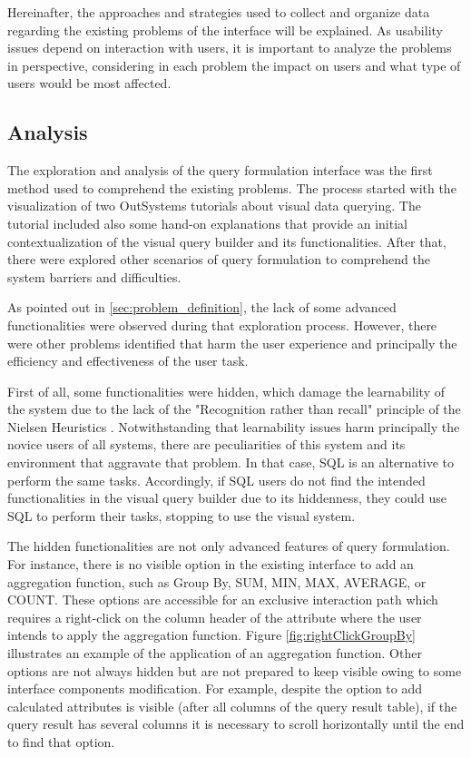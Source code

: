 Hereinafter, the approaches and strategies used to collect and organize data regarding the existing problems of the interface will be explained. As usability issues depend on interaction with users, it is important to analyze the problems in perspective, considering in each problem the impact on users and what type of users would be most affected.

\subsection{Analysis}
\label{subsec:analysis}

The exploration and analysis of the query formulation interface was the first method used to comprehend the existing problems. The process started with the visualization of two OutSystems tutorials \cite{outsystems_tutorial_aggregates_101, outsystems_tutorial_advanced_aggregates} about visual data querying. The tutorial included also some hand-on explanations that provide an initial contextualization of the visual query builder and its functionalities. After that, there were explored other scenarios of query formulation to comprehend the system barriers and difficulties.

As pointed out in \ref{sec:problem_definition}, the lack of some advanced functionalities were observed during that exploration process. However, there were other problems identified that harm the user experience and principally the efficiency and effectiveness of the user task.

First of all, some functionalities were hidden, which damage the learnability of the system due to the lack of the "Recognition rather than recall" principle of the Nielsen Heuristics \cite{nielsen_heuristics}. Notwithstanding that learnability issues harm principally the novice users of all systems, there are peculiarities of this system and its environment that aggravate that problem. In that case, SQL is an alternative to perform the same tasks. Accordingly, if SQL users do not find the intended functionalities in the visual query builder due to its hiddenness, they could use SQL to perform their tasks, stopping to use the visual system.

The hidden functionalities are not only advanced features of query formulation. For instance, there is no visible option in the existing interface to add an aggregation function, such as Group By, SUM, MIN, MAX, AVERAGE, or COUNT. These options are accessible for an exclusive interaction path which requires a right-click on the column header of the attribute where the user intends to apply the aggregation function. Figure \ref{fig:rightClickGroupBy} illustrates an example of the application of an aggregation function. Other options are not always hidden but are not prepared to keep visible owing to some interface components modification. For example, despite the option to add calculated attributes is visible (after all columns of the query result table), if the query result has several columns it is necessary to scroll horizontally until the end to find that option.

